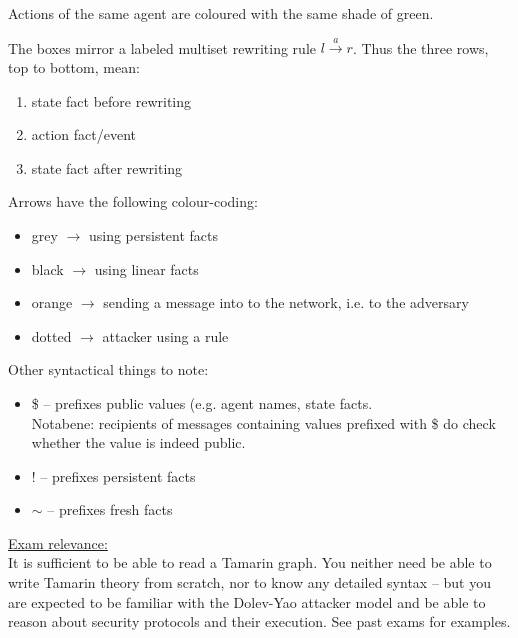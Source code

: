 Actions of the same agent are coloured with the same shade of green.

The boxes mirror a labeled multiset rewriting rule $l \xrightarrow{a} r$. Thus the three rows, top to bottom, mean:

\begin{enumerate}
    \item state fact before rewriting
    \item action fact/event
    \item state fact after rewriting
\end{enumerate}

Arrows have the following colour-coding:

\begin{itemize}
    \item grey   $\longrightarrow$ using persistent facts
    \item black  $\longrightarrow$ using linear facts
    \item orange $\longrightarrow$ sending a message into to the network, i.e. to the adversary
    \item dotted $\longrightarrow$ attacker using a rule
\end{itemize}

\pagebreak

Other syntactical things to note:

\begin{itemize}
    \item \$ -- prefixes public values (e.g. agent names, state facts. \\
                Notabene: recipients of messages containing values prefixed with \$ do check whether the value is indeed public.
    \item ! -- prefixes persistent facts
    \item $\sim$ -- prefixes fresh facts
\end{itemize}

\underline{Exam relevance:}\\
It is sufficient to be able to read a Tamarin graph. You neither need be able to write Tamarin theory from scratch, nor to know any detailed syntax -- but you are expected to be familiar with the Dolev-Yao attacker model and be able to reason about security protocols and their execution. See past exams for examples.


%
%